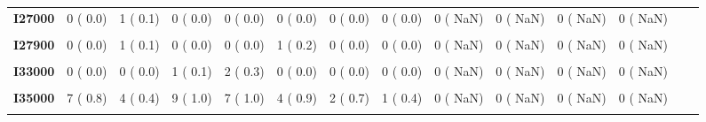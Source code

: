 \documentclass[
]{article}
\begin{document}
\begin{table}[H]
\begin{tabular}[t]{>{\raggedright\arraybackslash}p{5em}ccccccccccccc}
\textbf{I27000} & 0 (  0.0) & 1 (  0.1) & 0 (  0.0) & 0 (  0.0) & 0 (  0.0) & 0 (  0.0) & 0 (  0.0) & 0 (  NaN) & 0 (  NaN) & 0 (  NaN) & 0 (  NaN) &  & \\
\textbf{\cellcolor{gray!10}{I27200}} & \cellcolor{gray!10}{0 (  0.0)} & \cellcolor{gray!10}{1 (  0.1)} & \cellcolor{gray!10}{1 (  0.1)} & \cellcolor{gray!10}{2 (  0.3)} & \cellcolor{gray!10}{1 (  0.2)} & \cellcolor{gray!10}{0 (  0.0)} & \cellcolor{gray!10}{0 (  0.0)} & \cellcolor{gray!10}{0 (  NaN)} & \cellcolor{gray!10}{0 (  NaN)} & \cellcolor{gray!10}{0 (  NaN)} & \cellcolor{gray!10}{0 (  NaN)} & \cellcolor{gray!10}{} & \cellcolor{gray!10}{}\\
\textbf{I27900} & 0 (  0.0) & 1 (  0.1) & 0 (  0.0) & 0 (  0.0) & 1 (  0.2) & 0 (  0.0) & 0 (  0.0) & 0 (  NaN) & 0 (  NaN) & 0 (  NaN) & 0 (  NaN) &  & \\
\textbf{\cellcolor{gray!10}{I31900}} & \cellcolor{gray!10}{0 (  0.0)} & \cellcolor{gray!10}{1 (  0.1)} & \cellcolor{gray!10}{2 (  0.2)} & \cellcolor{gray!10}{0 (  0.0)} & \cellcolor{gray!10}{0 (  0.0)} & \cellcolor{gray!10}{0 (  0.0)} & \cellcolor{gray!10}{0 (  0.0)} & \cellcolor{gray!10}{0 (  NaN)} & \cellcolor{gray!10}{0 (  NaN)} & \cellcolor{gray!10}{0 (  NaN)} & \cellcolor{gray!10}{0 (  NaN)} & \cellcolor{gray!10}{} & \cellcolor{gray!10}{}\\
\textbf{I33000} & 0 (  0.0) & 0 (  0.0) & 1 (  0.1) & 2 (  0.3) & 0 (  0.0) & 0 (  0.0) & 0 (  0.0) & 0 (  NaN) & 0 (  NaN) & 0 (  NaN) & 0 (  NaN) &  & \\
\textbf{\cellcolor{gray!10}{I34000}} & \cellcolor{gray!10}{3 (  0.3)} & \cellcolor{gray!10}{0 (  0.0)} & \cellcolor{gray!10}{2 (  0.2)} & \cellcolor{gray!10}{2 (  0.3)} & \cellcolor{gray!10}{0 (  0.0)} & \cellcolor{gray!10}{0 (  0.0)} & \cellcolor{gray!10}{2 (  0.9)} & \cellcolor{gray!10}{0 (  NaN)} & \cellcolor{gray!10}{0 (  NaN)} & \cellcolor{gray!10}{0 (  NaN)} & \cellcolor{gray!10}{0 (  NaN)} & \cellcolor{gray!10}{} & \cellcolor{gray!10}{}\\
\textbf{I35000} & 7 (  0.8) & 4 (  0.4) & 9 (  1.0) & 7 (  1.0) & 4 (  0.9) & 2 (  0.7) & 1 (  0.4) & 0 (  NaN) & 0 (  NaN) & 0 (  NaN) & 0 (  NaN) &  & \\
\textbf{\cellcolor{gray!10}{I35800}} & \cellcolor{gray!10}{0 (  0.0)} & \cellcolor{gray!10}{1 (  0.1)} & \cellcolor{gray!10}{0 (  0.0)} & \cellcolor{gray!10}{0 (  0.0)} & \cellcolor{gray!10}{0 (  0.0)} & \cellcolor{gray!10}{0 (  0.0)} & \cellcolor{gray!10}{0 (  0.0)} & \cellcolor{gray!10}{0 (  NaN)} & \cellcolor{gray!10}{0 (  NaN)} & \cellcolor{gray!10}{0 (  NaN)} & \cellcolor{gray!10}{0 (  NaN)} & \cellcolor{gray!10}{} & \cellcolor{gray!10}{}\\

\end{tabular}
\end{table}
\end{document}
